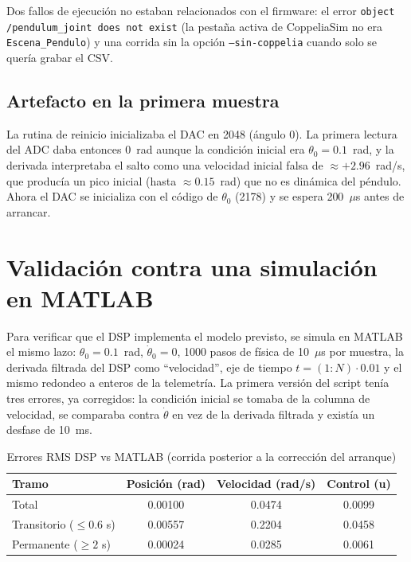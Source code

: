 \documentclass[11pt,a4paper]{article}
\begin{document}
Dos fallos de ejecución no estaban relacionados con el firmware: el error \texttt{object /pendulum\_joint does not exist} (la pestaña activa de CoppeliaSim no era \texttt{Escena\_Pendulo}) y una corrida sin la opción \texttt{--sin-coppelia} cuando solo se quería grabar el CSV.

\subsection{Artefacto en la primera muestra}
\label{sec:arranque}

La rutina de reinicio inicializaba el DAC en 2048 (ángulo 0). La primera lectura del ADC daba entonces 0~rad aunque la condición inicial era $\theta_0=0.1$~rad, y la derivada interpretaba el salto como una velocidad inicial falsa de $\approx +2.96$~rad/s, que producía un pico inicial (hasta $\approx 0.15$~rad) que no es dinámica del péndulo. Ahora el DAC se inicializa con el código de $\theta_0$ (2178) y se espera 200~$\mu$s antes de arrancar.

\section{Validación contra una simulación en MATLAB}
\label{sec:matlab}

Para verificar que el DSP implementa el modelo previsto, se simula en MATLAB el mismo lazo: $\theta_0=0.1$~rad, $\dot\theta_0=0$, 1000 pasos de física de 10~$\mu$s por muestra, la derivada filtrada del DSP como ``velocidad'', eje de tiempo $t=(1:N)\cdot 0.01$ y el mismo redondeo a enteros de la telemetría. La primera versión del script tenía tres errores, ya corregidos: la condición inicial se tomaba de la columna de velocidad, se comparaba contra $\dot\theta$ en vez de la derivada filtrada y existía un desfase de 10~ms.

\begin{table}[H]
\centering
\caption{Errores RMS DSP vs MATLAB (corrida posterior a la corrección del arranque)}
\begin{tabular}{lccc}
\hline
\textbf{Tramo} & \textbf{Posición (rad)} & \textbf{Velocidad (rad/s)} & \textbf{Control (u)} \\
\hline
Total                      & 0.00100 & 0.0474 & 0.0099 \\
Transitorio ($\le 0.6$ s)  & 0.00557 & 0.2204 & 0.0458 \\
Permanente ($\ge 2$ s)     & 0.00024 & 0.0285 & 0.0061 \\
\hline
\end{tabular}
\end{table}
\end{document}
